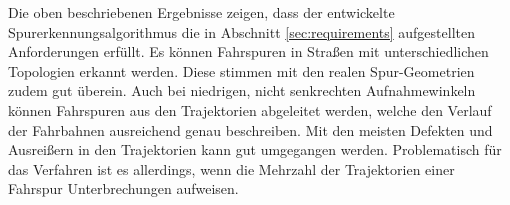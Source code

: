 
Die oben beschriebenen Ergebnisse zeigen, dass der entwickelte Spurerkennungsalgorithmus die in
Abschnitt \ref{sec:requirements} aufgestellten Anforderungen erfüllt.
Es können Fahrspuren in Straßen mit unterschiedlichen Topologien erkannt werden. Diese stimmen
mit den realen Spur-Geometrien zudem gut überein. Auch bei niedrigen, nicht senkrechten Aufnahmewinkeln können
Fahrspuren aus den Trajektorien abgeleitet werden, welche den Verlauf der Fahrbahnen ausreichend genau
beschreiben. Mit den meisten Defekten und Ausreißern in den Trajektorien kann gut umgegangen werden.
Problematisch für das Verfahren ist es allerdings, wenn die Mehrzahl der Trajektorien einer Fahrspur
Unterbrechungen aufweisen.